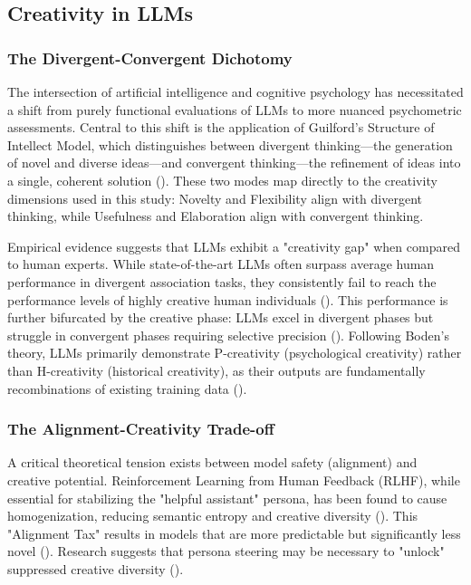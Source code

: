 \documentclass{article}
\begin{document}
\subsection{Creativity in LLMs}

\subsubsection{The Divergent-Convergent Dichotomy}

The intersection of artificial intelligence and cognitive psychology has necessitated a shift from purely functional evaluations of LLMs to more nuanced psychometric assessments. Central to this shift is the application of Guilford's Structure of Intellect Model, which distinguishes between divergent thinking—the generation of novel and diverse ideas—and convergent thinking—the refinement of ideas into a single, coherent solution (\cite{vikram_arora_67282d96, harsh_kumar_84fce084}). These two modes map directly to the creativity dimensions used in this study: Novelty and Flexibility align with divergent thinking, while Usefulness and Elaboration align with convergent thinking.

Empirical evidence suggests that LLMs exhibit a "creativity gap" when compared to human experts. While state-of-the-art LLMs often surpass average human performance in divergent association tasks, they consistently fail to reach the performance levels of highly creative human individuals (\cite{antoine_bellemare_pepin_a5621579}). This performance is further bifurcated by the creative phase: LLMs excel in divergent phases but struggle in convergent phases requiring selective precision (\cite{harsh_kumar_84fce084}). Following Boden's theory, LLMs primarily demonstrate P-creativity (psychological creativity) rather than H-creativity (historical creativity), as their outputs are fundamentally recombinations of existing training data (\cite{vikram_arora_67282d96, harsh_kumar_84fce084}).

\subsubsection{The Alignment-Creativity Trade-off}

A critical theoretical tension exists between model safety (alignment) and creative potential. Reinforcement Learning from Human Feedback (RLHF), while essential for stabilizing the "helpful assistant" persona, has been found to cause homogenization, reducing semantic entropy and creative diversity (\cite{antoine_bellemare_pepin_a5621579, behnam_mohammadi_78154429}). This "Alignment Tax" results in models that are more predictable but significantly less novel (\cite{michael_ryan_c7257c47}). Research suggests that persona steering may be necessary to "unlock" suppressed creative diversity (\cite{mete_ismayilzada_d0dea915}).
\end{document}

